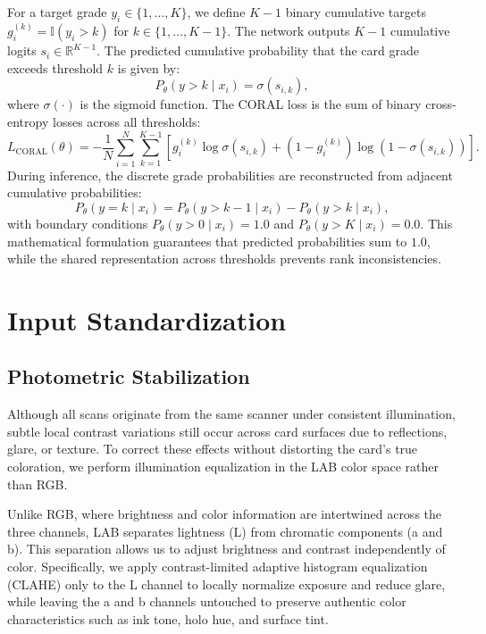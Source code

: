 \documentclass[12pt]{article}
\begin{document}
For a target grade $y_i \in \{1,\dots,K\}$, we define $K-1$ binary cumulative targets $g_i^{(k)} = \mathbb{I}(y_i > k)$ for $k \in \{1,\dots,K-1\}$.
The network outputs $K-1$ cumulative logits $s_i \in \mathbb{R}^{K-1}$.
The predicted cumulative probability that the card grade exceeds threshold $k$ is given by:
\[
P_\theta(y > k \mid x_i) = \sigma(s_{i,k}),
\]
where $\sigma(\cdot)$ is the sigmoid function.
The CORAL loss is the sum of binary cross-entropy losses across all thresholds:
\begin{equation}
L_{\text{CORAL}}(\theta) = -\frac{1}{N}\sum_{i=1}^{N}\sum_{k=1}^{K-1} \left[ g_i^{(k)} \log \sigma(s_{i,k}) + (1 - g_i^{(k)}) \log (1 - \sigma(s_{i,k})) \right].
\end{equation}
During inference, the discrete grade probabilities are reconstructed from adjacent cumulative probabilities:
\[
P_\theta(y = k \mid x_i) = P_\theta(y > k-1 \mid x_i) - P_\theta(y > k \mid x_i),
\]
with boundary conditions $P_\theta(y > 0 \mid x_i) = 1.0$ and $P_\theta(y > K \mid x_i) = 0.0$.
This mathematical formulation guarantees that predicted probabilities sum to $1.0$, while the shared representation across thresholds prevents rank inconsistencies.



\section{Input Standardization}

\subsection{Photometric Stabilization}
Although all scans originate from the same scanner under consistent illumination, subtle local contrast variations still occur across card surfaces due to reflections, glare, or texture.
To correct these effects without distorting the card’s true coloration, we perform illumination equalization in the LAB color space rather than RGB.

Unlike RGB, where brightness and color information are intertwined across the three channels, LAB separates lightness (L) from chromatic components (a and b).
This separation allows us to adjust brightness and contrast independently of color.
Specifically, we apply contrast-limited adaptive histogram equalization (CLAHE) only to the L channel to locally normalize exposure and reduce glare, while leaving the a and b channels untouched to preserve authentic color characteristics such as ink tone, holo hue, and surface tint.
\end{document}
